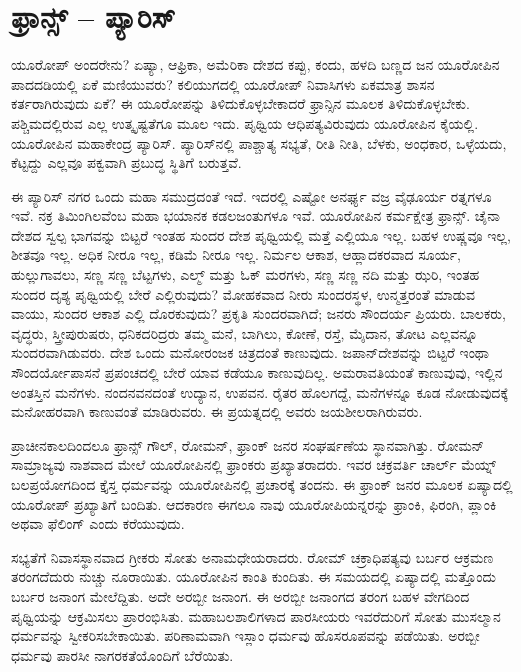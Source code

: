 \newpage

\section*{ಫ್ರಾನ್ಸ್ – ಪ್ಯಾರಿಸ್}

\vskip 8pt

\vskip 5pt

\vskip 5pt

ಯೂರೋಪ್​ ಅಂದರೇನು? ಏಷ್ಯಾ, ಆಫ್ರಿಕಾ, ಅಮೆರಿಕಾ ದೇಶದ ಕಪ್ಪು, ಕಂದು, ಹಳದಿ ಬಣ್ಣದ ಜನ ಯೂರೋಪಿನ ಪಾದದಡಿಯಲ್ಲಿ ಏಕೆ ಮಣಿಯುವರು? ಕಲಿಯುಗದಲ್ಲಿ ಯೂರೋಪ್​ ನಿವಾಸಿಗಳು ಏಕಮಾತ್ರ ಶಾಸನ ಕರ್ತರಾಗಿರುವುದು ಏಕೆ? ಈ ಯೂರೋಪನ್ನು ತಿಳಿದುಕೊಳ್ಳಬೇಕಾದರೆ ಫ್ರಾನ್ಸಿನ ಮೂಲಕ ತಿಳಿದುಕೊಳ್ಳಬೇಕು. ಪಶ್ಚಿಮದಲ್ಲಿರುವ ಎಲ್ಲ ಉತ್ಕೃಷ್ಟತೆಗೂ ಮೂಲ ಇದು. ಪೃಥ್ವಿಯ ಆಧಿಪತ್ಯವಿರುವುದು ಯೂರೋಪಿನ ಕೈಯಲ್ಲಿ. ಯೂರೋಪಿನ ಮಹಾಕೇಂದ್ರ ಪ್ಯಾರಿಸ್​. ಪ್ಯಾರಿಸ್​ನಲ್ಲಿ ಪಾಶ್ಚಾತ್ಯ ಸಭ್ಯತೆ, ರೀತಿ ನೀತಿ, ಬೆಳಕು, ಅಂಧಕಾರ, ಒಳ್ಳೆಯದು, ಕೆಟ್ಟದ್ದು ಎಲ್ಲವೂ ಪಕ್ವವಾಗಿ ಪ್ರಬುದ್ಧ ಸ್ಥಿತಿಗೆ ಬರುತ್ತವೆ.

\vskip 5pt

ಈ ಪ್ಯಾರಿಸ್​ ನಗರ ಒಂದು ಮಹಾ ಸಮುದ್ರದಂತೆ ಇದೆ. ಇದರಲ್ಲಿ ಎಷ್ಟೋ ಅನರ್ಘ್ಯ ವಜ್ರ ವೈಢೂರ್ಯ ರತ್ನಗಳೂ ಇವೆ. ನಕ್ರ ತಿಮಿಂಗಿಲವೆಂಬ ಮಹಾ ಭಯಾನಕ ಕಡಲಜಂತುಗಳೂ ಇವೆ. ಯೂರೋಪಿನ ಕರ್ಮಕ್ಷೇತ್ರ ಫ್ರಾನ್ಸ್​. ಚೈನಾ ದೇಶದ ಸ್ವಲ್ಪ ಭಾಗವನ್ನು ಬಿಟ್ಟರೆ ಇಂತಹ ಸುಂದರ ದೇಶ ಪೃಥ್ವಿಯಲ್ಲಿ ಮತ್ತೆ ಎಲ್ಲಿಯೂ ಇಲ್ಲ. ಬಹಳ ಉಷ್ಣವೂ ಇಲ್ಲ, ಶೀತವೂ ಇಲ್ಲ. ಅಧಿಕ ನೀರೂ ಇಲ್ಲ, ಕಡಿಮೆ ನೀರೂ ಇಲ್ಲ. ನಿರ್ಮಲ ಆಕಾಶ, ಆಹ್ಲಾದಕರವಾದ ಸೂರ್ಯ, ಹುಲ್ಲುಗಾವಲು, ಸಣ್ಣ ಸಣ್ಣ ಬೆಟ್ಟಗಳು, ಎಲ್ಮ್​ ಮತ್ತು ಓಕ್​ ಮರಗಳು, ಸಣ್ಣ ಸಣ್ಣ ನದಿ ಮತ್ತು ಝರಿ, ಇಂತಹ ಸುಂದರ ದೃಶ್ಯ ಪೃಥ್ವಿಯಲ್ಲಿ ಬೇರೆ ಎಲ್ಲಿರುವುದು? ಮೋಹಕವಾದ ನೀರು ಸುಂದರಸ್ಥಳ, ಉನ್ಮತ್ತರಂತೆ ಮಾಡುವ ವಾಯು, ಸುಂದರ ಆಕಾಶ ಎಲ್ಲಿ ದೊರಕುವುದು? ಪ್ರಕೃತಿ ಸುಂದರವಾಗಿದೆ; ಜನರು ಸೌಂದರ್ಯ ಪ್ರಿಯರು. ಬಾಲಕರು, ವೃದ್ಧರು, ಸ್ತ್ರೀಪುರುಷರು, ಧನಿಕದರಿದ್ರರು ತಮ್ಮ ಮನೆ, ಬಾಗಿಲು, ಕೋಣೆ, ರಸ್ತೆ, ಮೈದಾನ, ತೋಟ ಎಲ್ಲವನ್ನೂ ಸುಂದರವಾಗಿಡುವರು. ದೇಶ ಒಂದು ಮನೋರಂಜಕ ಚಿತ್ರದಂತೆ ಕಾಣುವುದು. ಜಪಾನ್​ ದೇಶವನ್ನು ಬಿಟ್ಟರೆ ಇಂಥಾ ಸೌಂದರ್ಯೋಪಾಸನೆ ಪ್ರಪಂಚದಲ್ಲಿ ಬೇರೆ ಯಾವ ಕಡೆಯೂ ಕಾಣುವುದಿಲ್ಲ. ಅಮರಾವತಿಯಂತೆ ಕಾಣುವುವು, ಇಲ್ಲಿನ ಅಂತಸ್ತಿನ ಮನೆಗಳು. ನಂದನವನದಂತೆ ಉದ್ಯಾನ, ಉಪವನ. ರೈತರ ಹೊಲಗದ್ದೆ, ಮನೆಗಳನ್ನೂ ಕೂಡ ನೋಡುವುದಕ್ಕೆ ಮನೋಹರವಾಗಿ ಕಾಣುವಂತೆ ಮಾಡಿರುವರು. ಈ ಪ್ರಯತ್ನದಲ್ಲಿ ಅವರು ಜಯಶೀಲರಾಗಿರುವರು.

\vskip 5pt

ಪ್ರಾಚೀನಕಾಲದಿಂದಲೂ ಫ್ರಾನ್ಸ್​ ಗೌಲ್​, ರೋಮನ್​, ಫ್ರಾಂಕ್​ ಜನರ ಸಂಘರ್ಷಣೆಯ ಸ್ಥಾನವಾಗಿತ್ತು. ರೋಮನ್​ ಸಾಮ್ರಾಜ್ಯವು ನಾಶವಾದ ಮೇಲೆ ಯೂರೋಪಿನಲ್ಲಿ ಫ್ರಾಂಕರು ಪ್ರಖ್ಯಾತರಾದರು. ಇವರ ಚಕ್ರವರ್ತಿ ಚಾರ್ಲ್​ ಮೆಯ್ನ್​ ಬಲಪ್ರಯೋಗದಿಂದ ಕ್ತೈಸ್ತ ಧರ್ಮವನ್ನು ಯೂರೋಪಿನಲ್ಲಿ ಪ್ರಚಾರಕ್ಕೆ ತಂದನು. ಈ ಫ್ರಾಂಕ್​ ಜನರ ಮೂಲಕ ಏಷ್ಯಾದಲ್ಲಿ ಯೂರೋಪ್​ ಪ್ರಖ್ಯಾತಿಗೆ ಬಂದಿತು. ಆದಕಾರಣ ಈಗಲೂ ನಾವು ಯೂರೋಪಿಯನ್ನರನ್ನು ಫ್ರಾಂಕಿ, ಫಿರಂಗಿ, ಪ್ಲಾಂಕಿ ಅಥವಾ ಫೆಲಿಂಗ್​ ಎಂದು ಕರೆಯುವುದು.

\vskip 5pt

ಸಭ್ಯತೆಗೆ ನಿವಾಸಸ್ಥಾನವಾದ ಗ್ರೀಕರು ಸೋತು ಅನಾಮಧೇಯರಾದರು. ರೋಮ್​ ಚಕ್ರಾಧಿಪತ್ಯವು ಬರ್ಬರ ಆಕ್ರಮಣ ತರಂಗದೆದುರು ನುಚ್ಚು ನೂರಾಯಿತು. ಯೂರೋಪಿನ ಕಾಂತಿ ಕುಂದಿತು. ಈ ಸಮಯದಲ್ಲಿ ಏಷ್ಯಾದಲ್ಲಿ ಮತ್ತೊಂದು ಬರ್ಬರ ಜನಾಂಗ ಮೇಲೆದ್ದಿತು. ಅದೇ ಅರಬ್ಬೀ ಜನಾಂಗ. ಈ ಅರಬ್ಬೀ ಜನಾಂಗದ ತರಂಗ ಬಹಳ ವೇಗದಿಂದ ಪೃಥ್ವಿಯನ್ನು ಆಕ್ರಮಿಸಲು ಪ್ರಾರಂಭಿಸಿತು. ಮಹಾಬಲಶಾಲಿಗಳಾದ ಪಾರಸೀಯರು ಇವರೆದುರಿಗೆ ಸೋತು ಮುಸಲ್ಮಾನ ಧರ್ಮವನ್ನು ಸ್ವೀಕರಿಸಬೇಕಾಯಿತು. ಪರಿಣಾಮವಾಗಿ ಇಸ್ಲಾಂ ಧರ್ಮವು ಹೊಸರೂಪವನ್ನು ಪಡೆಯಿತು. ಅರಬ್ಬೀ ಧರ್ಮವು ಪಾರಸೀ ನಾಗರಕತೆಯೊಂದಿಗೆ ಬೆರೆಯಿತು.

